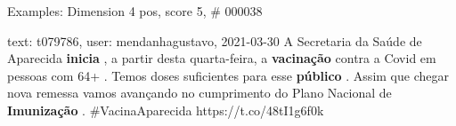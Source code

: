 \begin{frame}{Examples: Dimension 4 pos, score 5, \# 000038}
\footnotesize
\begin{exampleblock}{text: t079786, user: mendanhagustavo, 2021-03-30}
A Secretaria da Saúde de Aparecida \textbf{inicia} , a partir desta 
quarta-feira, a \textbf{vacinação} contra a Covid em pessoas com 64+ . Temos 
doses suficientes para esse \textbf{público} . Assim que chegar nova remessa 
vamos avançando no cumprimento do Plano Nacional de \textbf{Imunização} . 
\#VacinaAparecida https://t.co/48tI1g6f0k 
\end{exampleblock}
\end{frame}
